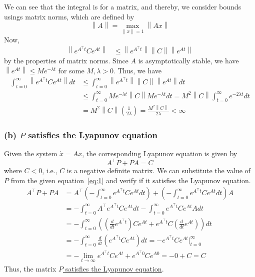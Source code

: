 We can see that the integral is for a matrix, and thereby, we consider bounds usings matrix norms, which are defined by
\begin{equation*}
    \left \| A \right \| = \max_{\left \| x \right \| = 1} \left \| A x \right \|
\end{equation*}
Now,
\begin{align*}
    \left \| e^{A^{\top} t} C e^{A t} \right \|
     & \leq
    \left \| e^{A^{\top} t} \right \| \left \| C \right \| \left \| e^{A t} \right \|
\end{align*}
by the properties of matrix norms.
Since \( A \) is asymptotically stable, we have \( \left \| e^{A t} \right \| \leq M e^{-\lambda t} \) for some \( M, \lambda > 0 \).
Thus, we have
\begin{align*}
    \int_{t=0}^{\infty} \left \| e^{A^{\top} t} C e^{A t} \right \| d t
     & \leq
    \int_{t=0}^{\infty} \left \| e^{A^{\top} t} \right \| \left \| C \right \| \left \| e^{A t} \right \| d t
    \\ & \leq
    \int_{t=0}^{\infty} M e^{-\lambda t} \left \| C \right \| M e^{-\lambda t} d t
    =
    M^2 \left \| C \right \| \int_{t=0}^{\infty} e^{-2 \lambda t} d t
    \\ & =
    M^2 \left \| C \right \| \left( \frac{1}{2 \lambda} \right)
    =
    \frac{M^2 \left \| C \right \|}{2 \lambda}
    <
    \infty
\end{align*}

\subsubsection*{(b) \( P \) satisfies the Lyapunov equation}

Given the system \( \dot x = A x \), the corresponding Lyapunov equation is given by
\begin{equation*}
    A^{\top} P + P A = C
\end{equation*}
where \( C < 0 \), i.e., \( C \) is a negative definite matrix.
We can substitute the value of \( P \) from the given equation~\eqref{eq:1} and verify if it satisfies the Lyapunov equation.
\begin{align*}
    A^\top P + P A
     & =
    A^\top \left( -\int_{t=0}^{\infty} e^{A^{\top} t} C e^{A t} d t \right) + \left( -\int_{t=0}^{\infty} e^{A^{\top} t} C e^{A t} d t \right) A
    \\ & =
    -\int_{t=0}^{\infty} A^\top e^{A^{\top} t} C e^{A t} d t - \int_{t=0}^{\infty} e^{A^{\top} t} C e^{A t} A d t
    \\ & =
    -\int_{t=0}^{\infty} \left( \left( \frac{d}{dt} e^{A^{\top} t} \right) C e^{A t} + e^{A^{\top} t} C \left( \frac{d}{dt} e^{A t} \right) \right) d t
    \\ & =
    -\int_{t=0}^{\infty} \frac{d}{dt} \left( e^{A^{\top} t} C e^{A t} \right) d t
    =
    - e^{A^{\top} t} C e^{A t} \Big|_{t=0}^{\infty}
    \\ & =
    - \lim_{t \to \infty} e^{A^{\top} t} C e^{A t} + e^{A^{\top} 0} C e^{A 0}
    =
    - 0 + C
    =
    C
\end{align*}
Thus, the matrix \underline{\( P \) satisfies the Lyapunov equation}.

